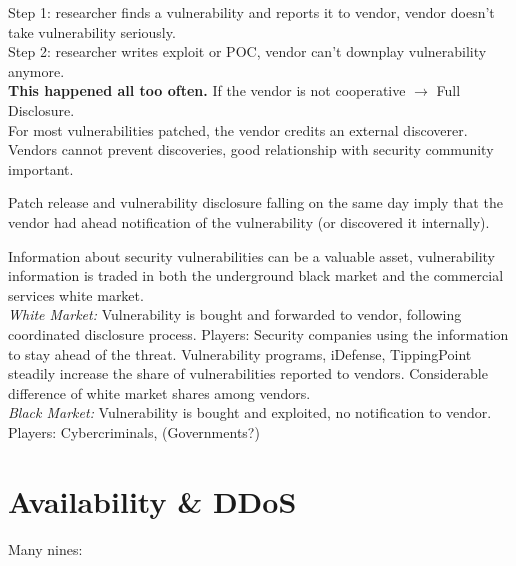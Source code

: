  Step 1: researcher finds a vulnerability and reports it to vendor, vendor doesn't take vulnerability seriously.\\
Step 2: researcher writes exploit or POC, vendor can't downplay vulnerability anymore.\\
\textbf{This happened all too often.}
If the vendor is not cooperative $\to$ Full Disclosure. \\
For most vulnerabilities patched, the vendor credits an external discoverer. Vendors cannot prevent discoveries, good relationship with security community important.

 Patch release and vulnerability disclosure falling on the
same day imply that the vendor had ahead notification of the vulnerability (or discovered it internally).

 Information about security vulnerabilities can be a valuable asset, vulnerability information is traded in both the underground black market and the commercial services white market.\\
\emph{White Market:} Vulnerability is bought and forwarded to vendor, following coordinated disclosure process. Players: Security companies using the information to stay ahead of the threat. Vulnerability programs, iDefense, TippingPoint steadily increase the share of vulnerabilities reported to vendors. Considerable difference of white market shares among vendors.\\
\textit{Black Market:} Vulnerability is bought and exploited, no notification to vendor. Players: Cybercriminals, (Governments?)

\section{Availability \& DDoS}


 Many nines:


